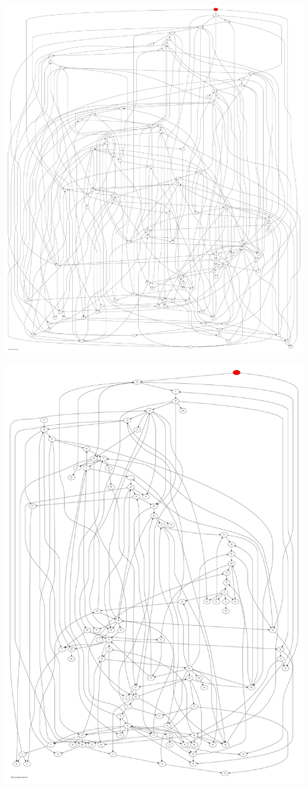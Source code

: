 \documentclass{article}
\begin{document}
\newpage
\includegraphics[max height=\textheight,max width=\textwidth]{bl_looming_objs/bl_loom_obj7_pp.pdf}

\newpage
\includegraphics[max height=\textheight,max width=\textwidth]{bl_looming_objs/bl_loom_obj8_pp.pdf}
\end{document}
